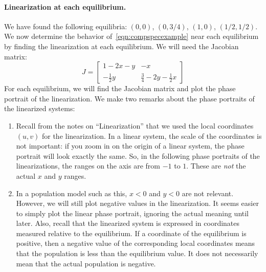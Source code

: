 \documentclass{book}
\begin{document}
\paragraph{Linearization at each equilibrium.}
We have found the following equilibria: $(0,0)$, $(0,3/4)$, $(1,0)$, $(1/2,1/2)$.
We now determine the behavior of~\eqref{eqn:compspecexample}
near each equilibrium by finding the linearization at each
equilibrium.
We will need the Jacobian matrix:
\begin{equation}
  J = \begin{bmatrix}
          1-2x-y & -x \\
	  -\frac{1}{2}y & \frac{3}{4}-2y-\frac{1}{2}x
      \end{bmatrix}
\end{equation}
For each equilibrium, we will find the Jacobian matrix
and plot the phase portrait of the linearization.
We make two remarks about the phase portraits of the linearized
systems:
\begin{enumerate}
\item
Recall from the notes on ``Linearization'' that we
used the local coordinates $(u,v)$ for the linearization.
In a linear system, the scale of the coordinates is not
important: if you zoom in on the origin of a linear system,
the phase portrait will look exactly the same.
So, in the following phase portraits of the linearizations,
the ranges on the axis are  from $-1$ to $1$.  These
are \emph{not} the actual $x$ and $y$ ranges.
\item
In a population model such as this, $x<0$ and $y<0$
are not relevant.  However, we will still plot negative
values in the linearization.  It seems easier to simply
plot the linear phase portrait, ignoring the actual
meaning until later.  Also, recall that the linearized
system is expressed in coordinates measured relative
to the equilibrium.  If a coordinate of the equilibrium
is positive, then a negative value of the corresponding
local coordinates means that the population is less than
the equilibrium value. It does not necessarily mean that
the actual population is negative.
\end{enumerate}

\medskip
\end{document}
